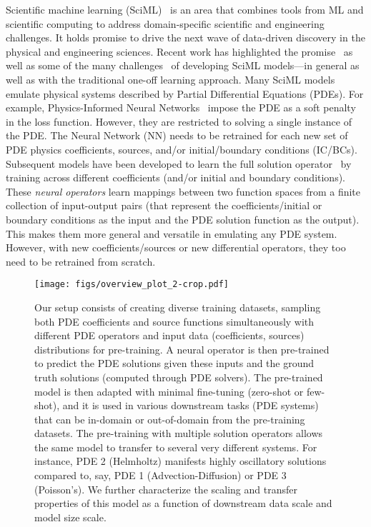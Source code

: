 Scientific machine learning (SciML)~\cite{stevens2020ai} is an area that combines tools from ML and scientific computing to address domain-specific scientific and engineering challenges.
It holds promise to drive the next wave of data-driven discovery in the physical and engineering sciences. 
%
Recent work has highlighted the promise~\cite{raissi2019physics,lu2021learning, li2020fourier,karniadakis2021review} as well as some of the many challenges~\cite{failure21_TR,EdwCACM22} of developing SciML models---in general as well as with the traditional one-off learning approach.
%
Many SciML models emulate physical systems described by Partial Differential Equations (PDEs).
For example, Physics-Informed Neural Networks~\cite{raissi2019physics,failure21_TR} impose the PDE as a soft penalty in the loss function.
However, they are restricted to solving a single instance of the PDE.
The Neural Network (NN) needs to be retrained for each new set of PDE physics coefficients, sources, and/or initial/boundary conditions (IC/BCs).
Subsequent models have been developed to learn the full solution operator~\cite{li2020fourier,lu2021learning} by training across different coefficients (and/or initial and boundary conditions). 
These \emph{neural operators} learn mappings between two function spaces from a finite collection of input-output pairs
(that represent the coefficients/initial or boundary conditions as the input and the PDE solution function as the output).
This makes them more general and versatile in emulating any PDE system.
However, with new coefficients/sources or new differential operators, they too need to be retrained from scratch.

\begin{figure*}[t]
  \centering
  \texttt{[image: figs/overview\_plot\_2-crop.pdf]}  
  \caption{Our setup consists of creating diverse training datasets, sampling both PDE coefficients and source functions simultaneously with different PDE operators and input data (coefficients, sources) distributions for pre-training. A neural operator is then pre-trained to predict the PDE solutions given these inputs and the ground truth solutions (computed through PDE solvers). The pre-trained model is then adapted with minimal fine-tuning (zero-shot or few-shot), and it is used in various downstream tasks (PDE systems) that can be in-domain or out-of-domain from the pre-training datasets. The pre-training with multiple solution operators allows the same model to transfer to several very different systems. For instance, PDE 2 (Helmholtz) manifests highly oscillatory solutions compared to, say, PDE 1 (Advection-Diffusion) or PDE 3 (Poisson's). We further characterize the scaling and transfer properties of this model as a function of downstream data scale and model size scale.
  }
  \label{fig:schematic}
\end{figure*}

